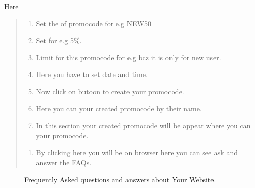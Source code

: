 \documentclass[a4paper,10pt,english]{report}
\begin{document}
Here
\begin{quote}
\begin{enumerate}
\def\theenumi{\arabic{enumi}}
\def\labelenumi{\theenumi .}
\makeatletter\def\p@enumii{\p@enumi \theenumi .}\makeatother
\item {} 
Set the  of promocode for e.g NEW50

\item {} 
Set  for e.g 5\%.

\item {} 
Limit  for this promocode for e.g  bcz it is only for new user.

\item {} 
Here you have to set  date and time.

\item {} 
Now click on  butoon to create your promocode.

\item {} 
Here you can  your created promocode by their name.

\item {} 
In this section your created promocode will be appear where you can  your promocode.

\end{enumerate}
\begin{enumerate}
\def\theenumi{\arabic{enumi}}
\def\labelenumi{\theenumi .}
\makeatletter\def\p@enumii{\p@enumi \theenumi .}\makeatother
\setcounter{enumi}{5}
\item {} 
By clicking here you will be on  browser here you can see  ask and answer the FAQs.

\end{enumerate}
\end{quote}

\begin{figure}[htbp]
\centering
\capstart

\noindent{}
\caption{Frequently Asked questions and answers about Your Website.}\label{\detokenize{configure:id14}}\label{\detokenize{configure:id6}}\end{figure}
\end{document}
